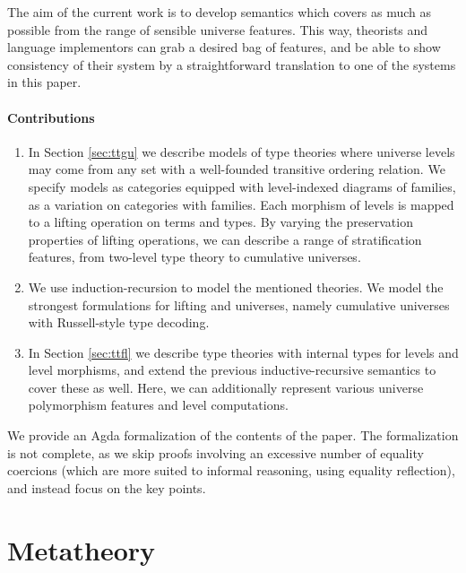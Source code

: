 \documentclass[a4paper,UKenglish,cleveref, autoref, thm-restate]{lipics-v2021}
\theoremstyle{remark}
\theoremstyle{definition}
\begin{document}
The aim of the current work is to develop semantics which covers as much as
possible from the range of sensible universe features. This way, theorists and
language implementors can grab a desired bag of features, and be able to show
consistency of their system by a straightforward translation to one of the
systems in this paper.

\paragraph*{Contributions}

\begin{enumerate}
\item In Section \ref{sec:ttgu} we describe models of type theories where
  universe levels may come from any set with a well-founded transitive ordering
  relation. We specify models as categories equipped with level-indexed diagrams
  of families, as a variation on categories with families. Each morphism of
  levels is mapped to a lifting operation on terms and types. By varying the
  preservation properties of lifting operations, we can describe a range of
  stratification features, from two-level type theory to cumulative universes.
\item We use induction-recursion to model the mentioned theories. We model
  the strongest formulations for lifting and universes, namely cumulative
  universes with Russell-style type decoding.
\item In Section \ref{sec:ttfl} we describe type theories with internal types
  for levels and level morphisms, and extend the previous inductive-recursive
  semantics to cover these as well. Here, we can additionally represent various
  universe polymorphism features and level computations.
\end{enumerate}

We provide an Agda formalization of the contents of the paper. The formalization
is not complete, as we skip proofs involving an excessive number of equality
coercions (which are more suited to informal reasoning, using equality
reflection), and instead focus on the key points.

\section{Metatheory}
\label{sec:metatheory}
\end{document}
